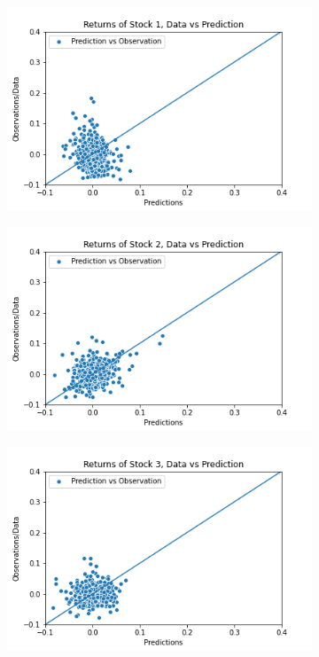 \begin{figure}%
	\centering
	\begin{subfigure}[l]{0.3\textwidth}
		\includegraphics[width=\textwidth]{img/07_0/N100/Q1_kernel1_stock1_scatter.png}
	\end{subfigure}
	\begin{subfigure}[c]{0.3\textwidth}
		\includegraphics[width=\textwidth]{img/07_0/N100/Q1_kernel1_stock2_scatter.png}
	\end{subfigure}
	\begin{subfigure}[r]{0.3\textwidth}
		\includegraphics[width=\textwidth]{img/07_0/N100/Q1_kernel1_stock3_scatter.png}

\end{subfigure}
\end{figure}

